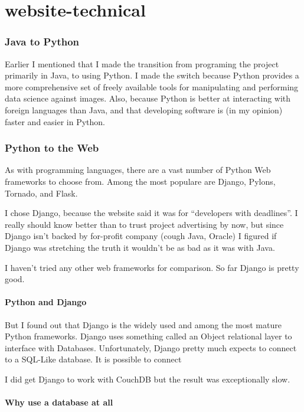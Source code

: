 \chapter{website-technical}

\subsection{Java to Python}

Earlier I mentioned that I made the transition from programing the project primarily in Java, to using Python.  I made the switch because Python provides a more comprehensive set of freely available tools for manipulating and performing data science against images.  Also, because Python is better at interacting with foreign languages than Java, and that developing software is (in my opinion) faster and easier in Python.

\subsection{Python to the Web}

As with programming languages, there are a vast number of Python Web frameworks to choose from.  Among the most populare are Django, Pylons, Tornado, and Flask.

I chose Django, because the website said it was for ``developers with deadlines''.  I really should know better than to trust project advertising by now, but since Django isn't backed by for-profit company (cough Java, Oracle) I figured if Django was stretching the truth it wouldn't be as bad as it was with Java.

I haven't tried any other web frameworks for comparison.   So far Django is pretty good.


\subsubsection{Python and Django}

But I found out that Django is the widely used and among the most mature Python frameworks.  Django uses something called an Object relational layer to interface with Databases.  Unfortunately, Django pretty much expects to connect to a SQL-Like database.  It is possible to connect 

I did get Django to work with CouchDB but the result was exceptionally slow.

\subsubsection{Why use a database at all}

